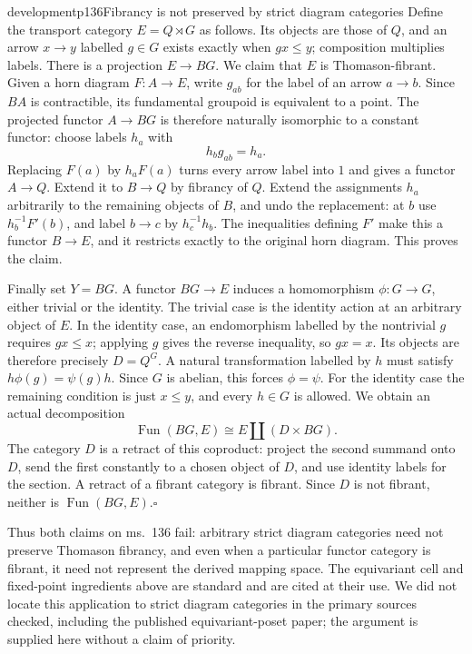 \begin{dcomment}{development}{p136}{Fibrancy is not preserved by strict diagram categories}
Define the transport category $E=Q\rtimes G$ as follows. Its objects are those of $Q$, and an arrow $x\to y$ labelled $g\in G$ exists exactly when $gx\leq y$; composition multiplies labels. There is a projection $E\to BG$. We claim that $E$ is Thomason-fibrant. Given a horn diagram $F:A\to E$, write $g_{ab}$ for the label of an arrow $a\to b$. Since $BA$ is contractible, its fundamental groupoid is equivalent to a point. The projected functor $A\to BG$ is therefore naturally isomorphic to a constant functor: choose labels $h_a$ with
\[
                         h_b g_{ab}=h_a.
\]
Replacing $F(a)$ by $h_aF(a)$ turns every arrow label into $1$ and gives a functor $A\to Q$. Extend it to $B\to Q$ by fibrancy of $Q$. Extend the assignments $h_a$ arbitrarily to the remaining objects of $B$, and undo the replacement: at $b$ use $h_b^{-1}F'(b)$, and label $b\to c$ by $h_c^{-1}h_b$. The inequalities defining $F'$ make this a functor $B\to E$, and it restricts exactly to the original horn diagram. This proves the claim.

Finally set $Y=BG$. A functor $BG\to E$ induces a homomorphism $\phi:G\to G$, either trivial or the identity. The trivial case is the identity action at an arbitrary object of $E$. In the identity case, an endomorphism labelled by the nontrivial $g$ requires $gx\leq x$; applying $g$ gives the reverse inequality, so $gx=x$. Its objects are therefore precisely $D=Q^G$. A natural transformation labelled by $h$ must satisfy $h\phi(g)=\psi(g)h$. Since $G$ is abelian, this forces $\phi=\psi$. For the identity case the remaining condition is just $x\leq y$, and every $h\in G$ is allowed. We obtain an actual decomposition
\[
             \operatorname{Fun}(BG,E)
                      \cong E\amalg(D\times BG).
\]
The category $D$ is a retract of this coproduct: project the second summand onto $D$, send the first constantly to a chosen object of $D$, and use identity labels for the section. A retract of a fibrant category is fibrant. Since $D$ is not fibrant, neither is $\operatorname{Fun}(BG,E)$.\hfill$\square$

Thus both claims on ms.~136 fail: arbitrary strict diagram categories need not preserve Thomason fibrancy, and even when a particular functor category is fibrant, it need not represent the derived mapping space. The equivariant cell and fixed-point ingredients above are standard and are cited at their use. We did not locate this application to strict diagram categories in the primary sources checked, including the published equivariant-poset paper; the argument is supplied here without a claim of priority.
\end{dcomment}

